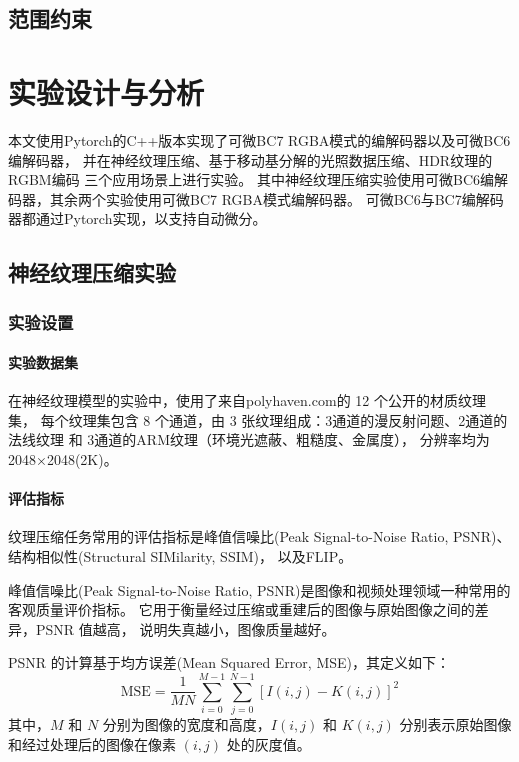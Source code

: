 \subsection{范围约束}
\label{范围约束}

\section{实验设计与分析}

本文使用Pytorch的C++版本实现了可微BC7 RGBA模式的编解码器以及可微BC6编解码器，
并在神经纹理压缩、基于移动基分解的光照数据压缩、HDR纹理的RGBM编码
三个应用场景上进行实验。
其中神经纹理压缩实验使用可微BC6编解码器，其余两个实验使用可微BC7 RGBA模式编解码器。
可微BC6与BC7编解码器都通过Pytorch实现，以支持自动微分。

\subsection{神经纹理压缩实验}

\subsubsection{实验设置}

\paragraph{实验数据集}

在神经纹理模型的实验中，使用了来自polyhaven.com\cite{PolyHaven}的 12 个公开的材质纹理集，
每个纹理集包含 8 个通道，由 3 张纹理组成：3通道的漫反射问题、2通道的法线纹理 和 3通道的ARM纹理（环境光遮蔽、粗糙度、金属度），
分辨率均为2048×2048(2K)。

\paragraph{评估指标}

纹理压缩任务常用的评估指标是峰值信噪比(Peak Signal-to-Noise Ratio, PSNR)、
结构相似性(Structural SIMilarity, SSIM)\cite{wang2004image}，
以及FLIP\cite{andersson2020flip}。

峰值信噪比(Peak Signal-to-Noise Ratio, PSNR)是图像和视频处理领域一种常用的客观质量评价指标。
它用于衡量经过压缩或重建后的图像与原始图像之间的差异，PSNR 值越高，
说明失真越小，图像质量越好。

PSNR 的计算基于均方误差(Mean Squared Error, MSE)，其定义如下：
\begin{equation}
\text{MSE} = \frac{1}{MN} \sum_{i=0}^{M-1} \sum_{j=0}^{N-1} \left[ I(i,j) - K(i,j) \right]^2
\end{equation}
其中，$M$ 和 $N$ 分别为图像的宽度和高度，$I(i,j)$ 和 $K(i,j)$ 分别表示原始图像和经过处理后的图像在像素 $(i,j)$ 处的灰度值。

